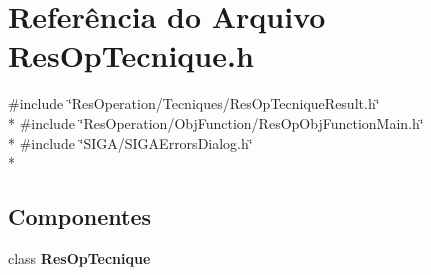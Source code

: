 \section{Referência do Arquivo Res\+Op\+Tecnique.\+h}
\label{_res_op_tecnique_8h}
{\ttfamily \#include \char`\"{}Res\+Operation/\+Tecniques/\+Res\+Op\+Tecnique\+Result.\+h\char`\"{}}\\*
{\ttfamily \#include \char`\"{}Res\+Operation/\+Obj\+Function/\+Res\+Op\+Obj\+Function\+Main.\+h\char`\"{}}\\*
{\ttfamily \#include \char`\"{}S\+I\+G\+A/\+S\+I\+G\+A\+Errors\+Dialog.\+h\char`\"{}}\\*
\subsection*{Componentes}
\begin{DoxyCompactItemize}
\item 
class {\bf Res\+Op\+Tecnique}
\end{DoxyCompactItemize}
